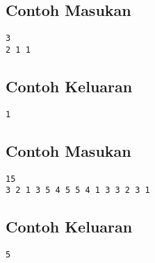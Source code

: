 \documentclass{article}
\begin{document}
\begin{multicols}{2}
\subsection*{Contoh Masukan}
\begin{lstlisting}
3
2 1 1
\end{lstlisting}
\columnbreak
\subsection*{Contoh Keluaran}
\begin{lstlisting}
1
\end{lstlisting}
\vfill
\null
\end{multicols}

\begin{multicols}{2}
\subsection*{Contoh Masukan}
\begin{lstlisting}
15
3 2 1 3 5 4 5 5 4 1 3 3 2 3 1
\end{lstlisting}
\columnbreak
\subsection*{Contoh Keluaran}
\begin{lstlisting}
5
\end{lstlisting}
\vfill
\null
\end{multicols}


\pagebreak
\end{document}
